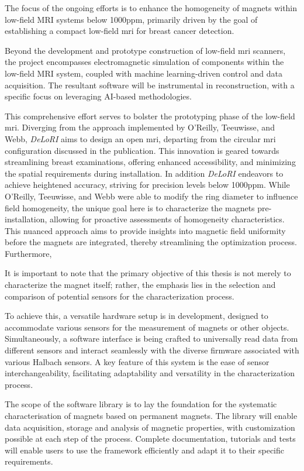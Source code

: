 The focus of the ongoing efforts is to enhance the homogeneity of
magnets within low-field MRI systems below 1000\gls{ppm}, primarily
driven by the goal of establishing a compact low-field \gls{mri} for
breast cancer detection.

Beyond the development and prototype construction of low-field \gls{mri}
scanners, the project encompasses electromagnetic simulation of
components within the low-field MRI system, coupled with machine
learning-driven control and data acquisition. The resultant software
will be instrumental in reconstruction, with a specific focus on
leveraging AI-based methodologies.

This comprehensive effort serves to bolster the prototyping phase of the
low-field \gls{mri}. Diverging from the approach implemented by
O'Reilly, Teeuwisse, and Webb, \emph{DeLoRI} aims to design an open
\gls{mri}, departing from the circular \gls{mri} configuration discussed
in the publication. This innovation is geared towards streamlining
breast examinations, offering enhanced accessibility, and minimizing the
spatial requirements during installation. In addition \emph{DeLoRI}
endeavors to achieve heightened accuracy, striving for precision levels
below 1000\gls{ppm}. While O'Reilly, Teeuwisse, and Webb were able to
modify the ring diameter to influence field homogeneity, the unique goal
here is to characterize the magnets pre-installation, allowing for
proactive assessments of homogeneity characteristics. This nuanced
approach aims to provide insights into magnetic field uniformity before
the magnets are integrated, thereby streamlining the optimization
process. Furthermore,

It is important to note that the primary objective of this thesis is not
merely to characterize the magnet itself; rather, the emphasis lies in
the selection and comparison of potential sensors for the
characterization process.

To achieve this, a versatile hardware setup is in development, designed
to accommodate various sensors for the measurement of magnets or other
objects. Simultaneously, a software interface is being crafted to
universally read data from different sensors and interact seamlessly
with the diverse firmware associated with various Halbach sensors. A key
feature of this system is the ease of sensor interchangeability,
facilitating adaptability and versatility in the characterization
process.

The scope of the software library is to lay the foundation for the
systematic characterisation of magnets based on permanent magnets. The
library will enable data acquisition, storage and analysis of magnetic
properties, with customization possible at each step of the process.
Complete documentation, tutorials and tests will enable users to use the
framework efficiently and adapt it to their specific requirements.

